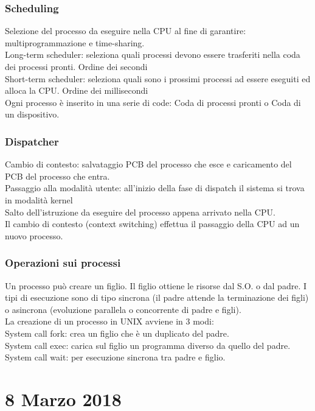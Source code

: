 \documentclass{article}
\begin{document}
\subsubsection*{Scheduling}
Selezione del processo da eseguire nella CPU al fine di garantire: multiprogrammazione e time-sharing.\\
Long-term scheduler: seleziona quali processi devono essere trasferiti nella coda dei processi pronti. Ordine dei secondi\\
Short-term scheduler: seleziona quali sono i prossimi processi ad essere eseguiti ed alloca la CPU. Ordine dei millisecondi\\
Ogni processo \`{e} inserito in una serie di code: Coda di processi pronti o Coda di un dispositivo.\\
\subsubsection*{Dispatcher}
Cambio di contesto: salvataggio PCB del processo che esce e caricamento del PCB del processo che entra.\\
Passaggio alla modalit\`{a} utente: all'inizio della fase di dispatch il sistema si trova in modalit\`{a} kernel\\
Salto dell'istruzione da eseguire del processo appena arrivato nella CPU.\\
Il cambio di contesto (context switching) effettua il passaggio della CPU ad un nuovo processo.
\subsubsection*{Operazioni sui processi}
Un processo pu\`{o} creare un figlio. Il figlio ottiene le risorse dal S.O. o dal padre. I tipi di esecuzione sono di tipo sincrona (il padre attende la terminazione dei figli) o asincrona (evoluzione parallela o concorrente di padre e figli).\\
La creazione di un processo in UNIX avviene in 3 modi:\\
System call fork: crea un figlio che \`{e} un duplicato del padre.\\
System call exec: carica sul figlio un programma diverso da quello del padre.\\
System call wait: per esecuzione sincrona tra padre e figlio.\\
\section*{8 Marzo 2018}
\end{document}
